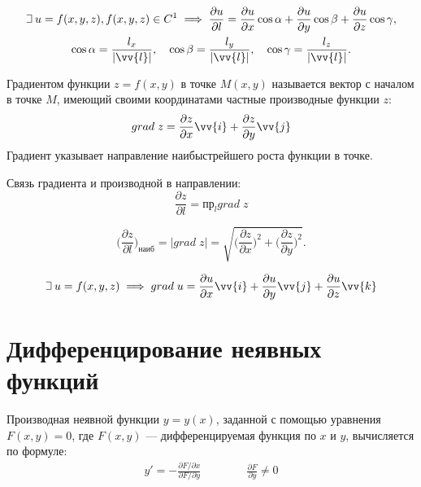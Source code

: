 \documentclass[a4paper,12pt,oneside]{extbook}
\def\lets{%
    \mathord{\setbox0=\hbox{$\exists$}%
        \hbox{\kern 0.125\wd0%
            \vbox to \ht0{%
                \hrule width 0.75\wd0%
                \vfill%
                \hrule width 0.75\wd0}%
            \vrule height \ht0%
            \kern 0.125\wd0}%
    }%
    \hspace{2pt}
}
\theoremstyle{numbered}
\theoremstyle{unnumbered}
\theoremstyle{named}
\theoremstyle{unnumbered}
\theoremstyle{named}
\theoremstyle{named}
\theoremstyle{named}
\begin{document}
\begin{equation}
    \begin{gathered}
        \lets u = f(x, y, z), f(x, y, z) \in C^1
        \implies
        \frac{\partial u}{\partial l} = \frac{\partial u}{\partial x} \cos{\alpha} + \frac{\partial u}{\partial y} \cos{\beta} + \frac{\partial u}{\partial z} \cos{\gamma},
        \\
        \cos{\alpha} = \frac{l_x}{|\vv{l}|},
        \quad
        \cos{\beta} = \frac{l_y}{|\vv{l}|},
        \quad
        \cos{\gamma} = \frac{l_z}{|\vv{l}|}.
    \end{gathered}
\end{equation}


Градиентом функции \(z = f(x, y)\) в точке \(M(x, y)\) называется вектор с началом в точке \(M\), имеющий своими координатами частные производные функции \(z\):
\begin{equation}
    grad \; z = \frac{\partial z}{\partial x} \vv{i} + \frac{\partial z}{\partial y} \vv{j}
\end{equation}
Градиент указывает направление наибыстрейшего роста функции в точке.

Связь градиента и производной в направлении:
\begin{equation}
    \frac{\partial z}{\partial l} = \text{пр}_l grad \; z
\end{equation}

\begin{equation}
    \Big(\frac{\partial z}{\partial l}\Big)_\text{наиб} = |grad \; z| = \sqrt{\Big(\frac{\partial z}{\partial x}\Big)^2 + \Big(\frac{\partial z}{\partial y}\Big)^2}.
\end{equation}

\begin{equation}
    \lets u = f(x, y, z)
    \implies
    grad \; u = \frac{\partial u}{\partial x}\vv{i} + \frac{\partial u}{\partial y}\vv{j} + \frac{\partial u}{\partial z}\vv{k}
\end{equation}

\section{Дифференцирование неявных функций}%
\label{sec:Дифференцирование неявных функций}

Производная неявной функции \(y = y(x)\), заданной с помощью уравнения \(F(x, y) = 0\), где \(F(x, y)\) — дифференцируемая функция по \(x\) и \(y\), вычисляется по формуле:
\begin{gather*}
    y' = -\frac{\partial F / \partial x}{\partial F / \partial y} \qquad \qquad \frac{\partial F}{\partial y} \neq 0
\end{gather*}
\end{document}
